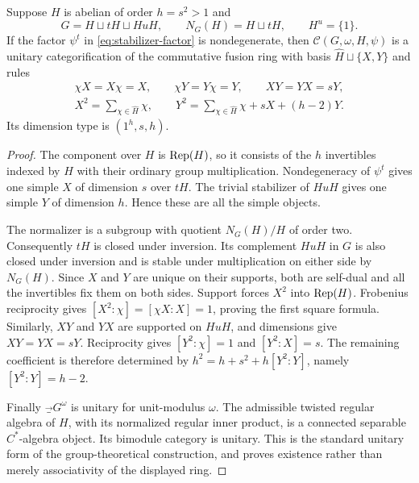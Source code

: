 \begin{theorem}\label{thm:three-coset}
Suppose $H$ is abelian of order $h=s^2>1$ and
\[
 G=H\sqcup tH\sqcup HuH,\qquad
 N_G(H)=H\sqcup tH,\qquad H^u=\{1\}.
\]
If the factor $\psi^t$ in \eqref{eq:stabilizer-factor} is nondegenerate,
then $\mathcal C(G,\omega,H,\psi)$ is a unitary categorification of the
commutative fusion ring with basis $\widehat H\sqcup\{X,Y\}$ and rules
\begin{equation}\label{eq:three-coset-ring}
\begin{gathered}
 \chi X=X\chi=X,\qquad\chi Y=Y\chi=Y,\qquad XY=YX=sY,\\
 X^2=\sum_{\chi\in\widehat H}\chi,\qquad
 Y^2=\sum_{\chi\in\widehat H}\chi+sX+(h-2)Y.
\end{gathered}
\end{equation}
Its dimension type is $(1^h,s,h)$.
\end{theorem}
\begin{proof}
The component over $H$ is $\operatorname{Rep}(H)$, so it consists of the $h$ invertibles
indexed by $\widehat H$ with their ordinary group multiplication.
Nondegeneracy of $\psi^t$ gives one simple $X$ of dimension $s$ over
$tH$. The trivial stabilizer of $HuH$ gives one simple $Y$ of dimension
$h$. Hence these are all the simple objects.

The normalizer is a subgroup with quotient $N_G(H)/H$ of order two.
Consequently $tH$ is closed under inversion. Its complement $HuH$ in
$G$ is also closed under inversion and is stable under multiplication
on either side by $N_G(H)$. Since $X$ and $Y$ are unique on their
supports, both are self-dual and all the invertibles fix them on both
sides. Support forces $X^2$ into $\operatorname{Rep}(H)$. Frobenius reciprocity gives
$[X^2:\chi]=[\chi X:X]=1$, proving the first square formula. Similarly,
$XY$ and $YX$ are supported on $HuH$, and dimensions give $XY=YX=sY$.
Reciprocity gives $[Y^2:\chi]=1$ and $[Y^2:X]=s$. The remaining
coefficient is therefore determined by
$h^2=h+s^2+h[Y^2:Y]$, namely $[Y^2:Y]=h-2$.

Finally $\Vec_G^\omega$ is unitary for unit-modulus $\omega$. The
admissible twisted regular algebra of $H$, with its normalized regular
inner product, is a connected separable $C^*$-algebra object. Its
bimodule category is unitary. This is the standard unitary form of the
group-theoretical construction, and proves existence rather than merely
associativity of the displayed ring.
\end{proof}

